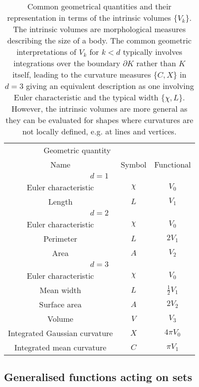 \begin{SCtable}
  \begin{minipage}[b]{\linewidth}
    \centering
    \begin{tabular}{ccc}
      \toprule
      \multicolumn{2}{c}{Geometric quantity} \\
      \cmidrule(r){1-2}
      Name & Symbol & Functional \\
      \midrule
      \multicolumn{3}{c}{$d = 1$} \\
      \midrule
      Euler characteristic & $\chi$ & $V_0$ \\
      Length & $L$ & $V_1$ \\
      \midrule
      \multicolumn{3}{c}{$d = 2$} \\
      \midrule
      Euler characteristic & $\chi$ & $V_0$ \\
      Perimeter & $L$ & $2 V_1$ \\
      Area & $A$ & $V_2$ \\
      \midrule
      \multicolumn{3}{c}{$d = 3$} \\
      \midrule
      Euler characteristic & $\chi$ & $V_0$ \\
      Mean width & $L$ & $\frac{1}{2} V_1$ \\
      Surface area & $A$ & $2 V_2$ \\
      Volume & $V$ & $V_3$ \\
      Integrated Gaussian curvature & $X$ & $4 \pi V_0$ \\
      Integrated mean curvature & $C$ & $\pi V_1$ \\
      \bottomrule
    \end{tabular}
  \end{minipage}
  \caption[Common geometrical quantities]{
    Common geometrical quantities and their representation in terms of the intrinsic volumes $\{V_k\}$.
    The intrinsic volumes are morphological measures describing the size of a body.
    The common geometric interpretations of $V_k$ for $k < d$ typically involves integrations over the boundary $\partial K$ rather than $K$ itself, leading to the curvature measures $\{C,X\}$ in $d=3$ giving an equivalent description as one involving Euler characteristic and the typical width $\{\chi, L\}$.
    However, the intrinsic volumes are more general as they can be evaluated for shapes where curvatures are not locally defined, e.g. at lines and vertices.}
  \label{table:geometric-quantities}
\end{SCtable}

\subsection{Generalised functions acting on sets}

